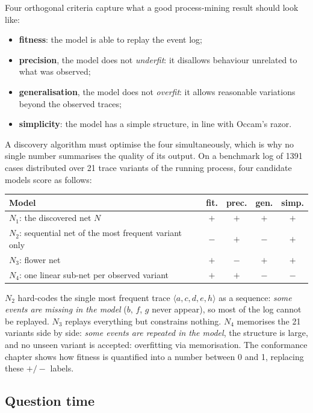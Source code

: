 Four orthogonal criteria capture what a good process-mining result should look like:
\begin{itemize}
  \item \textbf{fitness}: the model is able to replay the event log;
  \item \textbf{precision}, the model does not \emph{underfit}: it disallows behaviour unrelated to what was observed;
  \item \textbf{generalisation}, the model does not \emph{overfit}: it allows reasonable variations beyond the observed traces;
  \item \textbf{simplicity}: the model has a simple structure, in line with Occam's razor.
\end{itemize}
A discovery algorithm must optimise the four simultaneously, which is why no single number summarises the quality of its output. On a benchmark log of 1391 cases distributed over 21 trace variants of the running process, four candidate models score as follows:
\begin{center}
\small
\begin{tabular}{lcccc}
\toprule
\textbf{Model} & \textbf{fit.} & \textbf{prec.} & \textbf{gen.} & \textbf{simp.} \\
\midrule
$N_1$: the discovered net $N$ & $+$ & $+$ & $+$ & $+$ \\
$N_2$: sequential net of the most frequent variant only & $-$ & $+$ & $-$ & $+$ \\
$N_3$: flower net & $+$ & $-$ & $+$ & $+$ \\
$N_4$: one linear sub-net per observed variant & $+$ & $+$ & $-$ & $-$ \\
\bottomrule
\end{tabular}
\end{center}
$N_2$ hard-codes the single most frequent trace $\langle a, c, d, e, h\rangle$ as a sequence: \emph{some events are missing in the model} ($b$, $f$, $g$ never appear), so most of the log cannot be replayed. $N_3$ replays everything but constrains nothing. $N_4$ memorises the 21 variants side by side: \emph{some events are repeated in the model}, the structure is large, and no unseen variant is accepted: overfitting via memorisation. The conformance chapter shows how fitness is quantified into a number between 0 and 1, replacing these $+/-$ labels.

\subsection{Question time}

